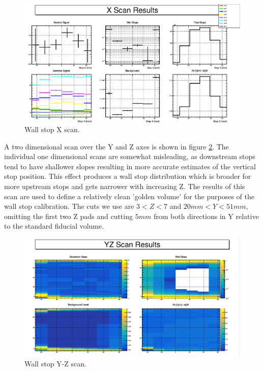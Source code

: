 \begin{figure}[h]
  \includegraphics[width=\textwidth]{neutrons/figures/scan_X.png}
  \caption{Wall stop X scan.}
  \label{fig:scan_x}
\end{figure}

A two dimensional scan over the Y and Z axes is shown in figure \ref{fig:scan_yz}.
The individual one dimensional scans are somewhat misleading, as downstream stops tend to have shallower slopes resulting in more accurate estimates of the vertical stop position.
This effect produces a wall stop distribution which is broader for more upstream stops and gets narrower with increasing Z.
The results of this scan are used to define a relatively clean 'golden volume' for the purposes of the wall stop calibration.
The cuts we use are $3<Z<7$ and $20mm<Y<51mm$, omitting the first two Z pads and cutting $5mm$ from both directions in Y relative to the standard fiducial volume.

\begin{figure}[h]
  \includegraphics[width=\textwidth]{neutrons/figures/scan_YZ.png}
  \caption{Wall stop Y-Z scan.}
  \label{fig:scan_yz}
\end{figure}

